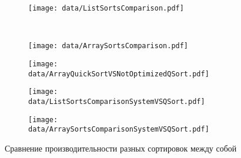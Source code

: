 \begin{figure}[H]
	\centering
	\begin{subfigure}[b]{0.40\textwidth}
       \centering
	   \texttt{[image: data/ListSortsComparison.pdf]}
	   \label{fig:"ListSortsComparison}
	\end{subfigure}~
	\begin{subfigure}[b]{0.40\textwidth}
       \centering
	   \texttt{[image: data/ArraySortsComparison.pdf]}
	   \label{fig:ArraySortsComparison}
	\end{subfigure}
	\begin{subfigure}[b]{0.40\textwidth}
       \centering
	   \texttt{[image: data/ArrayQuickSortVSNotOptimizedQSort.pdf]}
	   \label{fig:ArrayQuickSortVSNotOptimizedQSort.pdf}
	\end{subfigure}
	\begin{subfigure}[b]{0.40\textwidth}
       \centering
	   \texttt{[image: data/ListSortsComparisonSystemVSQSort.pdf]}
	   \label{fig:ListSortsComparisonSystemVSQSort}
	\end{subfigure}
	\begin{subfigure}[b]{0.40\textwidth}
       \centering
	   \texttt{[image: data/ArraySortsComparisonSystemVSQSort.pdf]}
	   \label{fig:ArraySortsComparisonSystemVSQSort}
	\end{subfigure}
	\caption{Сравнение производительности разных сортировок между собой}
	\label{fig:SortsComparison}	
\end{figure}



